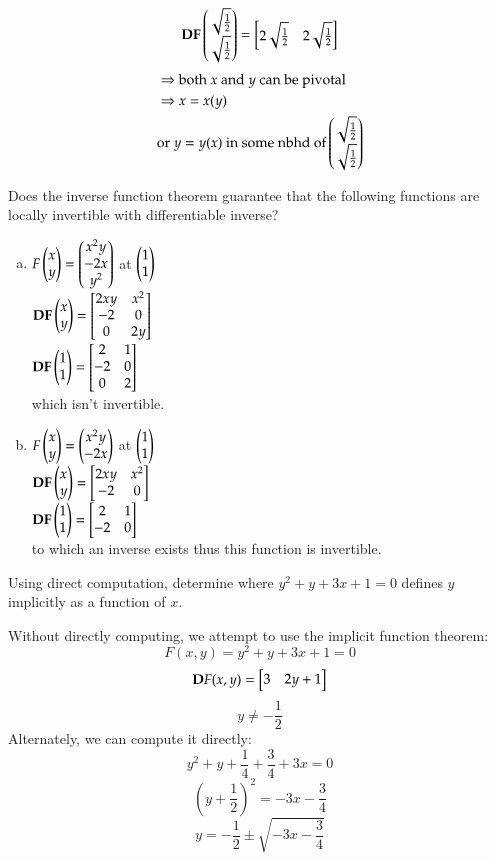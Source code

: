 \[\textbf{DF}\begin{pmatrix} \sqrt{\frac{1}{2}} \\ \sqrt{\frac{1}{2}} \end{pmatrix}=\begin{bmatrix} 2\sqrt{\frac{1}{2}} & 2\sqrt{\frac{1}{2}} \end{bmatrix}\]
\begin{align*}
  &\Rightarrow \text{both $x$ and $y$ can be pivotal} \\
  &\Rightarrow x = x(y) \\
  &\text{or $y = y(x)$ in some nbhd of} \begin{pmatrix} \sqrt{\frac{1}{2}} \\ \sqrt{\frac{1}{2}} \end{pmatrix}
\end{align*}

Does the inverse function theorem guarantee that the following functions are locally invertible with differentiable inverse?

\begin{enumerate}[a.]
  \item $F\begin{pmatrix} x \\ y \end{pmatrix}=\begin{pmatrix} x^2y \\ -2x \\ y^2 \end{pmatrix}$ at $\begin{pmatrix} 1 \\ 1 \end{pmatrix}$ \\
  $\textbf{DF}\begin{pmatrix} x \\ y \end{pmatrix} = \begin{bmatrix} 2xy & x^2 \\ -2 & 0 \\ 0 & 2y \end{bmatrix}$ \\
  $\textbf{DF}\begin{pmatrix} 1 \\ 1 \end{pmatrix} = \begin{bmatrix} 2 & 1 \\ -2 & 0 \\ 0 & 2 \end{bmatrix}$ \\
  which isn't invertible.
  \item $F\begin{pmatrix} x \\ y \end{pmatrix} = \begin{pmatrix} x^2y \\ -2x \end{pmatrix}$ at $\begin{pmatrix} 1 \\ 1 \end{pmatrix}$ \\
  $\textbf{DF}\begin{pmatrix} x \\ y \end{pmatrix} = \begin{bmatrix} 2xy & x^2 \\ -2 & 0 \end{bmatrix}$ \\
  $\textbf{DF}\begin{pmatrix} 1 \\ 1 \end{pmatrix} = \begin{bmatrix} 2 & 1 \\ -2 & 0 \end{bmatrix}$ \\
  to which an inverse exists thus this function is invertible.
\end{enumerate}

Using direct computation, determine where $y^2 + y +3x + 1 = 0$ defines $y$ implicitly as a function of $x$.

Without directly computing, we attempt to use the implicit function theorem:
\[F(x, y) = y^2 + y +3x + 1 = 0\]
\[\textbf{D}F(x, y) = \begin{bmatrix} 3 & 2y+1 \end{bmatrix}\]
\[y\neq -\frac{1}{2}\]
Alternately, we can compute it directly:
\[y^2 + y + \frac{1}{4} + \frac{3}{4} + 3x = 0\]
\[(y+\frac{1}{2})^2=-3x-\frac{3}{4}\]
\[y = -\frac{1}{2}\pm \sqrt{-3x-\frac{3}{4}}\]
